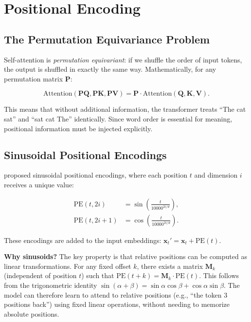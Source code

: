 \section{Positional Encoding}
\label{sec:positional-encoding}

\subsection{The Permutation Equivariance Problem}

Self-attention is \emph{permutation equivariant}: if we shuffle the order of input tokens, the output is shuffled in exactly the same way. Mathematically, for any permutation matrix $\mathbf{P}$:

\begin{equation}
\text{Attention}(\mathbf{P}\mathbf{Q}, \mathbf{P}\mathbf{K}, \mathbf{P}\mathbf{V}) = \mathbf{P} \cdot \text{Attention}(\mathbf{Q}, \mathbf{K}, \mathbf{V}).
\end{equation}

This means that without additional information, the transformer treats ``The cat sat'' and ``sat cat The'' identically. Since word order is essential for meaning, positional information must be injected explicitly.

\subsection{Sinusoidal Positional Encodings}

\citet{vaswani2017} proposed sinusoidal positional encodings, where each position $t$ and dimension $i$ receives a unique value:

\begin{align}
\text{PE}(t, 2i) &= \sin\!\left(\frac{t}{10000^{2i/d}}\right), \label{eq:pe-sin} \\
\text{PE}(t, 2i+1) &= \cos\!\left(\frac{t}{10000^{2i/d}}\right). \label{eq:pe-cos}
\end{align}

These encodings are added to the input embeddings: $\mathbf{x}_t' = \mathbf{x}_t + \text{PE}(t)$.

\textbf{Why sinusoids?} The key property is that relative positions can be computed as linear transformations. For any fixed offset $k$, there exists a matrix $\mathbf{M}_k$ (independent of position $t$) such that $\text{PE}(t+k) = \mathbf{M}_k \cdot \text{PE}(t)$. This follows from the trigonometric identity $\sin(\alpha + \beta) = \sin\alpha\cos\beta + \cos\alpha\sin\beta$. The model can therefore learn to attend to relative positions (e.g., ``the token 3 positions back'') using fixed linear operations, without needing to memorize absolute positions.

